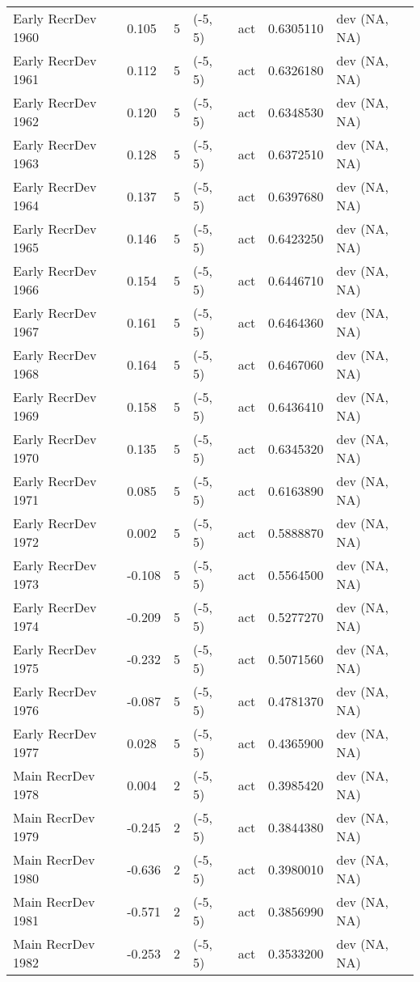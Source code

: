\documentclass[11pt,
  english,
  a4paper,
]{article}
\begin{document}
\begin{landscape}
\begin{longtable}[t]{>{\raggedright\arraybackslash}p{6cm}lllll>{\raggedright\arraybackslash}p{4cm}}
Early RecrDev 1960 & 0.105 & 5 & (-5, 5) & act & 0.6305110 & dev (NA, NA)\\
Early RecrDev 1961 & 0.112 & 5 & (-5, 5) & act & 0.6326180 & dev (NA, NA)\\
Early RecrDev 1962 & 0.120 & 5 & (-5, 5) & act & 0.6348530 & dev (NA, NA)\\
Early RecrDev 1963 & 0.128 & 5 & (-5, 5) & act & 0.6372510 & dev (NA, NA)\\
Early RecrDev 1964 & 0.137 & 5 & (-5, 5) & act & 0.6397680 & dev (NA, NA)\\
Early RecrDev 1965 & 0.146 & 5 & (-5, 5) & act & 0.6423250 & dev (NA, NA)\\
Early RecrDev 1966 & 0.154 & 5 & (-5, 5) & act & 0.6446710 & dev (NA, NA)\\
Early RecrDev 1967 & 0.161 & 5 & (-5, 5) & act & 0.6464360 & dev (NA, NA)\\
Early RecrDev 1968 & 0.164 & 5 & (-5, 5) & act & 0.6467060 & dev (NA, NA)\\
Early RecrDev 1969 & 0.158 & 5 & (-5, 5) & act & 0.6436410 & dev (NA, NA)\\
Early RecrDev 1970 & 0.135 & 5 & (-5, 5) & act & 0.6345320 & dev (NA, NA)\\
Early RecrDev 1971 & 0.085 & 5 & (-5, 5) & act & 0.6163890 & dev (NA, NA)\\
Early RecrDev 1972 & 0.002 & 5 & (-5, 5) & act & 0.5888870 & dev (NA, NA)\\
Early RecrDev 1973 & -0.108 & 5 & (-5, 5) & act & 0.5564500 & dev (NA, NA)\\
Early RecrDev 1974 & -0.209 & 5 & (-5, 5) & act & 0.5277270 & dev (NA, NA)\\
Early RecrDev 1975 & -0.232 & 5 & (-5, 5) & act & 0.5071560 & dev (NA, NA)\\
Early RecrDev 1976 & -0.087 & 5 & (-5, 5) & act & 0.4781370 & dev (NA, NA)\\
Early RecrDev 1977 & 0.028 & 5 & (-5, 5) & act & 0.4365900 & dev (NA, NA)\\
Main RecrDev 1978 & 0.004 & 2 & (-5, 5) & act & 0.3985420 & dev (NA, NA)\\
Main RecrDev 1979 & -0.245 & 2 & (-5, 5) & act & 0.3844380 & dev (NA, NA)\\
Main RecrDev 1980 & -0.636 & 2 & (-5, 5) & act & 0.3980010 & dev (NA, NA)\\
Main RecrDev 1981 & -0.571 & 2 & (-5, 5) & act & 0.3856990 & dev (NA, NA)\\
Main RecrDev 1982 & -0.253 & 2 & (-5, 5) & act & 0.3533200 & dev (NA, NA)\\

\end{longtable}
\end{landscape}
\end{document}
